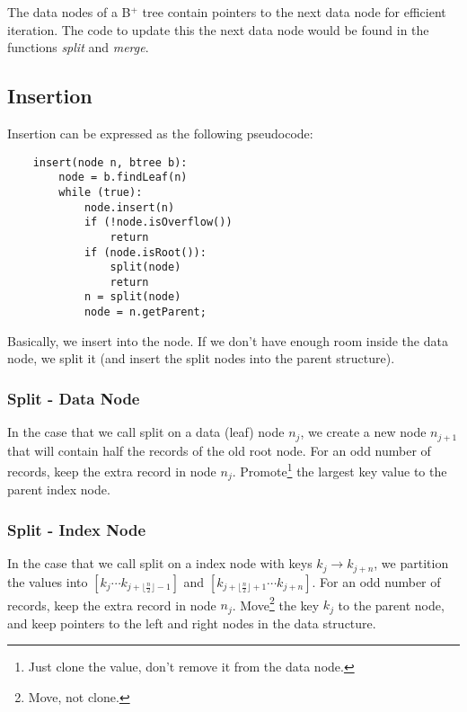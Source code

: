 				The data nodes of a B$^+$ tree contain pointers to the next data node for efficient iteration.
				The code to update this the next data node would be found in the functions \emph{split} and \emph{merge}.

                \subsection{Insertion} %
                \label{sub:insertion}

				
                    Insertion can be expressed as the following pseudocode:
                    \begin{verbatim}
    insert(node n, btree b):
        node = b.findLeaf(n)
        while (true):
            node.insert(n)
            if (!node.isOverflow())
                return
            if (node.isRoot()):
                split(node)
                return
            n = split(node)
            node = n.getParent;
                    \end{verbatim}
                    Basically, we insert into the node.
                    If we don't have enough room inside the data node, we split it (and insert the split nodes into the parent structure).

                    \subsubsection{Split - Data Node} %
                    \label{ssub:split_data_node}
                        In the case that we call split on a data (leaf) node $n_j$, we create a new node $n_{j+1}$ that will contain half the records of the old root node.
                        For an odd number of records, keep the extra record in node $n_j$.
                        Promote\footnote{Just clone the value, don't remove it from the data node.} the largest key value to the parent index node.
                    \subsubsection{Split - Index Node} %
                    \label{ssub:split_index_node}
					In the case that we call split on a index node with keys $k_j \to k_{j+n}$, we partition the values into $[k_j \cdots k_{j+ \lfloor\frac{n}{2}\rfloor - 1}]$ and $[k_{j+ \lfloor\frac{n}{2}\rfloor + 1} \cdots  k_{j+n}]$.
                        For an odd number of records, keep the extra record in node $n_j$.
                        Move\footnote{Move, not clone.} the key $k_j$ to the parent node, and keep pointers to the left and right nodes in the data structure.
